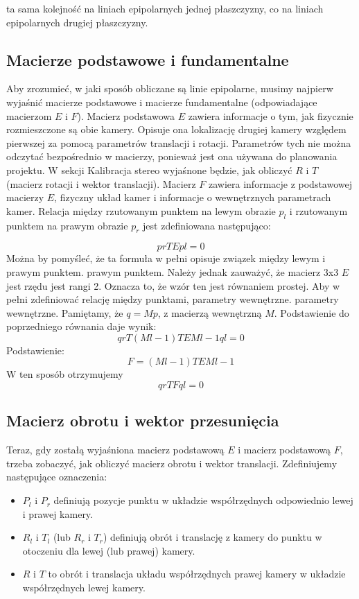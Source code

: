 \documentclass[magisterska]{pracadypl}
\begin{document}
ta sama kolejność na liniach epipolarnych jednej płaszczyzny, co na liniach epipolarnych drugiej płaszczyzny.

\subsection{Macierze podstawowe i fundamentalne}

Aby zrozumieć, w jaki sposób obliczane są linie epipolarne, musimy najpierw wyjaśnić macierze podstawowe
i macierze fundamentalne (odpowiadające macierzom $E$ i $F$).
Macierz podstawowa $E$ zawiera informacje o tym, jak fizycznie rozmieszczone są obie kamery.
Opisuje ona lokalizację drugiej kamery względem pierwszej za pomocą parametrów translacji i rotacji.
Parametrów tych nie można odczytać bezpośrednio w macierzy, ponieważ jest ona używana do planowania projektu. W sekcji Kalibracja stereo wyjaśnone będzie, jak obliczyć $R$ i $T$ (macierz rotacji i wektor translacji).
Macierz $F$ zawiera informacje z podstawowej macierzy $E$, fizyczny układ kamer i informacje o wewnętrznych parametrach kamer.
Relacja między rzutowanym punktem na lewym obrazie $p_l$ i rzutowanym punktem na prawym obrazie $p_r$ jest zdefiniowana następująco:

\[prTEpl=0\]
Można by pomyśleć, że ta formuła w pełni opisuje związek między lewym i prawym punktem.
prawym punktem. Należy jednak zauważyć, że macierz 3x3 $E$ jest rzędu
jest rangi 2. Oznacza to, że wzór ten jest równaniem prostej.
Aby w pełni zdefiniować relację między punktami, parametry wewnętrzne.
parametry wewnętrzne.
Pamiętamy, że $q = Mp$, z macierzą wewnętrzną $M$.
Podstawienie do poprzedniego równania daje wynik:
\[qrT(Ml-1)TEMl-1ql=0\]
Podstawienie:\\
\[F=(Ml-1)TEMl-1\]
W ten sposób otrzymujemy\\
\[qrTFql=0\]

\subsection{Macierz obrotu i wektor przesunięcia}

Teraz, gdy zostałą wyjaśniona macierz podstawową $E$ i macierz podstawową $F$, trzeba zobaczyć, jak obliczyć macierz obrotu i wektor translacji.
Zdefiniujemy następujące oznaczenia:

\begin{itemize}
  \item $P_l$ i $P_r$ definiują pozycje punktu w układzie współrzędnych odpowiednio lewej i prawej kamery.
  \item $R_l$ i $T_l$ (lub $R_r$ i $T_r$) definiują obrót i translację z kamery
do punktu w otoczeniu dla lewej (lub prawej) kamery.
  \item $R$ i $T$ to obrót i translacja układu współrzędnych prawej kamery w układzie współrzędnych lewej kamery.
\end{itemize}
\end{document}
